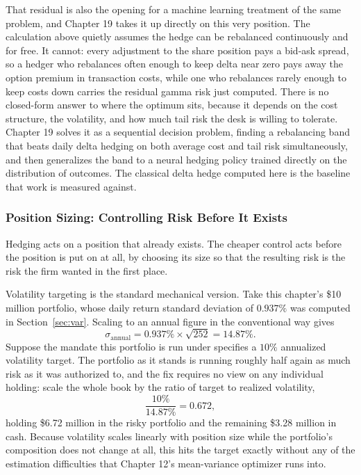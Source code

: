 \documentclass[../ai_in_finance]{subfiles}
\begin{document}
That residual is also the opening for a machine learning treatment of the same problem, and Chapter 19 takes it up directly on this very position. The calculation above quietly assumes the hedge can be rebalanced continuously and for free. It cannot: every adjustment to the share position pays a bid-ask spread, so a hedger who rebalances often enough to keep delta near zero pays away the option premium in transaction costs, while one who rebalances rarely enough to keep costs down carries the residual gamma risk just computed. There is no closed-form answer to where the optimum sits, because it depends on the cost structure, the volatility, and how much tail risk the desk is willing to tolerate. Chapter 19 solves it as a sequential decision problem, finding a rebalancing band that beats daily delta hedging on both average cost and tail risk simultaneously, and then generalizes the band to a neural hedging policy trained directly on the distribution of outcomes. The classical delta hedge computed here is the baseline that work is measured against.

\subsubsection*{Position Sizing: Controlling Risk Before It Exists}

Hedging acts on a position that already exists. The cheaper control acts before the position is put on at all, by choosing its size so that the resulting risk is the risk the firm wanted in the first place.

Volatility targeting is the standard mechanical version. Take this chapter's \$10 million portfolio, whose daily return standard deviation of $0.937\%$ was computed in Section~\ref{sec:var}. Scaling to an annual figure in the conventional way gives
\begin{equation*}
\sigma_{\text{annual}} = 0.937\% \times \sqrt{252} = 14.87\%.
\end{equation*}
Suppose the mandate this portfolio is run under specifies a $10\%$ annualized volatility target. The portfolio as it stands is running roughly half again as much risk as it was authorized to, and the fix requires no view on any individual holding: scale the whole book by the ratio of target to realized volatility,
\begin{equation*}
\frac{10\%}{14.87\%} = 0.672,
\end{equation*}
holding \$6.72 million in the risky portfolio and the remaining \$3.28 million in cash. Because volatility scales linearly with position size while the portfolio's composition does not change at all, this hits the target exactly without any of the estimation difficulties that Chapter 12's mean-variance optimizer runs into.
\end{document}
